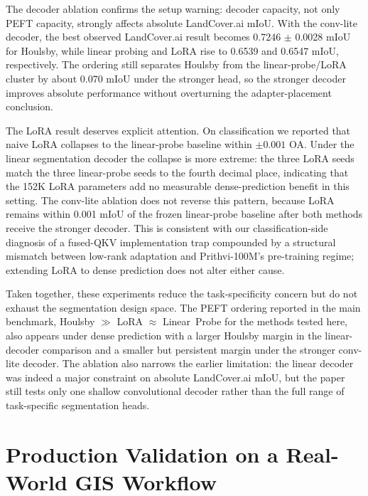 \documentclass[11pt]{article}
\begin{document}
The decoder ablation confirms the setup warning: decoder capacity, not only PEFT capacity, strongly affects absolute LandCover.ai mIoU. With the conv-lite decoder, the best observed LandCover.ai result becomes 0.7246 $\pm$ 0.0028 mIoU for Houlsby, while linear probing and LoRA rise to 0.6539 and 0.6547 mIoU, respectively. The ordering still separates Houlsby from the linear-probe/LoRA cluster by about 0.070 mIoU under the stronger head, so the stronger decoder improves absolute performance without overturning the adapter-placement conclusion.

The LoRA result deserves explicit attention. On classification we reported that naive LoRA collapses to the linear-probe baseline within $\pm 0.001$ OA. Under the linear segmentation decoder the collapse is more extreme: the three LoRA seeds match the three linear-probe seeds to the fourth decimal place, indicating that the 152K LoRA parameters add no measurable dense-prediction benefit in this setting. The conv-lite ablation does not reverse this pattern, because LoRA remains within 0.001 mIoU of the frozen linear-probe baseline after both methods receive the stronger decoder. This is consistent with our classification-side diagnosis of a fused-QKV implementation trap compounded by a structural mismatch between low-rank adaptation and Prithvi-100M's pre-training regime; extending LoRA to dense prediction does not alter either cause.

Taken together, these experiments reduce the task-specificity concern but do not exhaust the segmentation design space. The PEFT ordering reported in the main benchmark, Houlsby $\gg$ LoRA $\approx$ Linear~Probe for the methods tested here, also appears under dense prediction with a larger Houlsby margin in the linear-decoder comparison and a smaller but persistent margin under the stronger conv-lite decoder. The ablation also narrows the earlier limitation: the linear decoder was indeed a major constraint on absolute LandCover.ai mIoU, but the paper still tests only one shallow convolutional decoder rather than the full range of task-specific segmentation heads.


\section{Production Validation on a Real-World GIS Workflow}
\label{sec:linhe}
\end{document}
